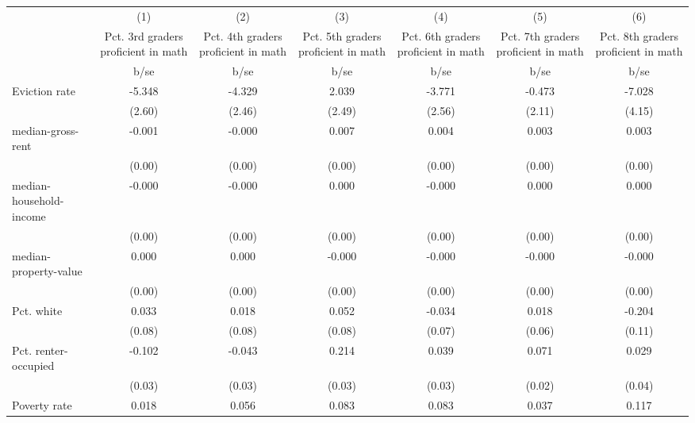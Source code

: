 {
\def\sym#1{\ifmmode^{#1}\else\(^{#1}\)\fi}
\begin{tabular}{l*{6}{c}}
\hline\hline
                    &\multicolumn{1}{c}{(1)}&\multicolumn{1}{c}{(2)}&\multicolumn{1}{c}{(3)}&\multicolumn{1}{c}{(4)}&\multicolumn{1}{c}{(5)}&\multicolumn{1}{c}{(6)}\\
                    &\multicolumn{1}{c}{Pct. 3rd graders proficient in math}&\multicolumn{1}{c}{Pct. 4th graders proficient in math}&\multicolumn{1}{c}{Pct. 5th graders proficient in math}&\multicolumn{1}{c}{Pct. 6th graders proficient in math}&\multicolumn{1}{c}{Pct. 7th graders proficient in math}&\multicolumn{1}{c}{Pct. 8th graders proficient in math}\\
                    &        b/se&        b/se&        b/se&        b/se&        b/se&        b/se\\
\hline
Eviction rate       &      -5.348&      -4.329&       2.039&      -3.771&      -0.473&      -7.028\\
                    &      (2.60)&      (2.46)&      (2.49)&      (2.56)&      (2.11)&      (4.15)\\
median-gross-rent   &      -0.001&      -0.000&       0.007&       0.004&       0.003&       0.003\\
                    &      (0.00)&      (0.00)&      (0.00)&      (0.00)&      (0.00)&      (0.00)\\
median-household-income&      -0.000&      -0.000&       0.000&      -0.000&       0.000&       0.000\\
                    &      (0.00)&      (0.00)&      (0.00)&      (0.00)&      (0.00)&      (0.00)\\
median-property-value&       0.000&       0.000&      -0.000&      -0.000&      -0.000&      -0.000\\
                    &      (0.00)&      (0.00)&      (0.00)&      (0.00)&      (0.00)&      (0.00)\\
Pct. white          &       0.033&       0.018&       0.052&      -0.034&       0.018&      -0.204\\
                    &      (0.08)&      (0.08)&      (0.08)&      (0.07)&      (0.06)&      (0.11)\\
Pct. renter-occupied&      -0.102&      -0.043&       0.214&       0.039&       0.071&       0.029\\
                    &      (0.03)&      (0.03)&      (0.03)&      (0.03)&      (0.02)&      (0.04)\\
Poverty rate        &       0.018&       0.056&       0.083&       0.083&       0.037&       0.117\\

\end{tabular}}
